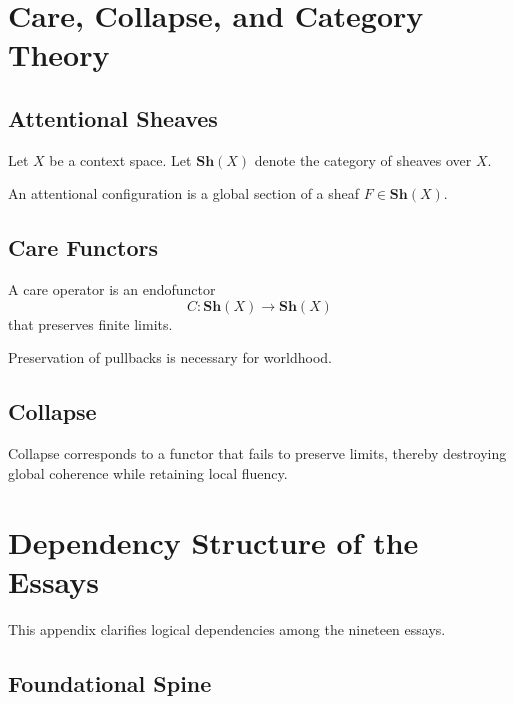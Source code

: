 \documentclass[11pt]{book}
\begin{document}
\chapter{Care, Collapse, and Category Theory}

\section{Attentional Sheaves}

Let $X$ be a context space. Let $\textbf{Sh}(X)$ denote the category of
sheaves over $X$.

\begin{definition}
An attentional configuration is a global section of a sheaf
$F \in \textbf{Sh}(X)$.
\end{definition}

\section{Care Functors}

\begin{definition}
A care operator is an endofunctor
\[
C : \textbf{Sh}(X) \to \textbf{Sh}(X)
\]
that preserves finite limits.
\end{definition}

\begin{lemma}
Preservation of pullbacks is necessary for worldhood.
\end{lemma}

\section{Collapse}

\begin{proposition}
Collapse corresponds to a functor that fails to preserve limits,
thereby destroying global coherence while retaining local fluency.
\end{proposition}


\chapter{Dependency Structure of the Essays}

This appendix clarifies logical dependencies among the nineteen essays.

\section{Foundational Spine}
\end{document}
